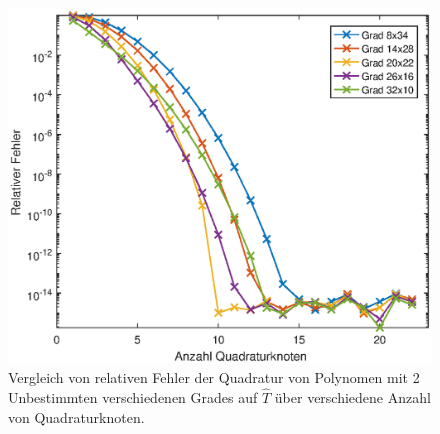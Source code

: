 \documentclass[french, 12pt, a4paper, onesided]{scrartcl}
\theoremstyle{plain}
\theoremstyle{definition}
\theoremstyle{remark}
\begin{document}
\begin{figure}[h]
\centering
\includegraphics[width=0.9\linewidth]{Rel-Fehler-R.eps}
\caption{Vergleich von relativen Fehler der Quadratur von Polynomen mit 2 Unbestimmten verschiedenen Grades auf $\hat{T}$ über verschiedene Anzahl von Quadraturknoten.}
\label{fig:relErrort}
\end{figure}
\end{document}
